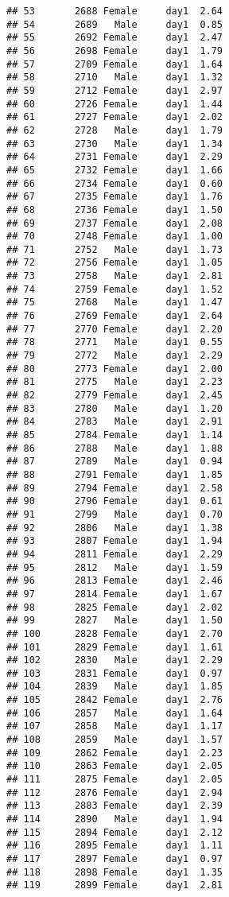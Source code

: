 \documentclass[
]{article}
\begin{document}
\begin{verbatim}
## 53       2688 Female     day1  2.64
## 54       2689   Male     day1  0.85
## 55       2692 Female     day1  2.47
## 56       2698 Female     day1  1.79
## 57       2709 Female     day1  1.64
## 58       2710   Male     day1  1.32
## 59       2712 Female     day1  2.97
## 60       2726 Female     day1  1.44
## 61       2727 Female     day1  2.02
## 62       2728   Male     day1  1.79
## 63       2730   Male     day1  1.34
## 64       2731 Female     day1  2.29
## 65       2732 Female     day1  1.66
## 66       2734 Female     day1  0.60
## 67       2735 Female     day1  1.76
## 68       2736 Female     day1  1.50
## 69       2737 Female     day1  2.08
## 70       2748 Female     day1  1.00
## 71       2752   Male     day1  1.73
## 72       2756 Female     day1  1.05
## 73       2758   Male     day1  2.81
## 74       2759 Female     day1  1.52
## 75       2768   Male     day1  1.47
## 76       2769 Female     day1  2.64
## 77       2770 Female     day1  2.20
## 78       2771   Male     day1  0.55
## 79       2772   Male     day1  2.29
## 80       2773 Female     day1  2.00
## 81       2775   Male     day1  2.23
## 82       2779 Female     day1  2.45
## 83       2780   Male     day1  1.20
## 84       2783   Male     day1  2.91
## 85       2784 Female     day1  1.14
## 86       2788   Male     day1  1.88
## 87       2789   Male     day1  0.94
## 88       2791 Female     day1  1.85
## 89       2794 Female     day1  2.58
## 90       2796 Female     day1  0.61
## 91       2799   Male     day1  0.70
## 92       2806   Male     day1  1.38
## 93       2807 Female     day1  1.94
## 94       2811 Female     day1  2.29
## 95       2812   Male     day1  1.59
## 96       2813 Female     day1  2.46
## 97       2814 Female     day1  1.67
## 98       2825 Female     day1  2.02
## 99       2827   Male     day1  1.50
## 100      2828 Female     day1  2.70
## 101      2829 Female     day1  1.61
## 102      2830   Male     day1  2.29
## 103      2831 Female     day1  0.97
## 104      2839   Male     day1  1.85
## 105      2842 Female     day1  2.76
## 106      2857   Male     day1  1.64
## 107      2858   Male     day1  1.17
## 108      2859   Male     day1  1.57
## 109      2862 Female     day1  2.23
## 110      2863 Female     day1  2.05
## 111      2875 Female     day1  2.05
## 112      2876 Female     day1  2.94
## 113      2883 Female     day1  2.39
## 114      2890   Male     day1  1.94
## 115      2894 Female     day1  2.12
## 116      2895 Female     day1  1.11
## 117      2897 Female     day1  0.97
## 118      2898 Female     day1  1.35
## 119      2899 Female     day1  2.81

\end{verbatim}
\end{document}

